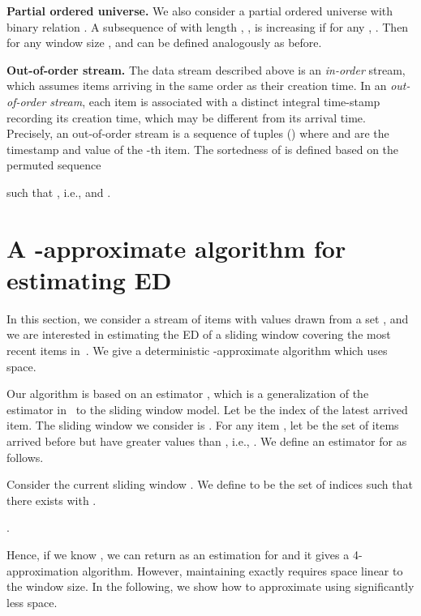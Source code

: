 \documentclass{llncs}
\newcommand{\runtitle}[1]{{\small \textbf{\boldmath #1}}}
\begin{document}
\runtitle{Partial ordered universe.}
We also consider a partial ordered universe
with binary relation .
A subsequence of  with length ,
,
is increasing
if for any , .
Then for any window size ,
 and  can be defined analogously as before.

\runtitle{Out-of-order stream.}
The data stream described above is an \emph{in-order} stream,
which assumes items arriving in the same order as their creation time.
In an \emph{out-of-order stream},
each item is associated with a distinct integral time-stamp recording
its creation time, which may be different from its arrival time.
Precisely, an out-of-order stream 
is a sequence of tuples  ()
where  and  are the timestamp and value of the -th item.
The sortedness of  is defined based on the permuted sequence

such that , i.e.,
 and .


\section{A -approximate algorithm for estimating ED}\label{sec:main}

In this section, we consider a stream  of items with values drawn
from a set ,
and we are interested in estimating the ED of a sliding window covering
the most recent  items in~.
We give a deterministic -approximate algorithm
which uses  space.

Our algorithm is based on an estimator , which is a generalization of the estimator in~\cite{GJK+07}
to the sliding window model.
Let  be the index of the latest arrived item.
The sliding window we consider is
.
For any item , let  be the set of items
arrived before  but have greater values than
, i.e., .
We define an estimator  for  as follows.

\begin{definition}
Consider the current sliding window .
We define  to be the set of indices  such that
there exists  with .
\end{definition}



\begin{lemma} \label{lem:estimator}
.
\end{lemma}

Hence, if we know ,
we can return  as an estimation for 
and it gives a 4-approximation algorithm.
However, maintaining  exactly requires space linear
to the window size. In the following, we show how to approximate
 using significantly less space.
\end{document}

